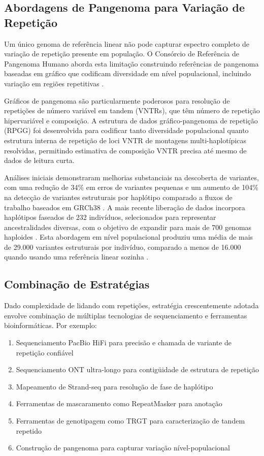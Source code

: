 \subsection{Abordagens de Pangenoma para Variação de Repetição}

Um único genoma de referência linear não pode capturar espectro completo de variação de repetição presente em população. O Consórcio de Referência de Pangenoma Humano \parencite{wang2022} aborda esta limitação construindo referências de pangenoma baseadas em gráfico que codificam diversidade em nível populacional, incluindo variação em regiões repetitivas \parencite{liao2023}.

Gráficos de pangenoma são particularmente poderosos para resolução de repetições de número variável em tandem (VNTRs), que têm número de repetição hipervariável e composição. A estrutura de dados gráfico-pangenoma de repetição (RPGG) foi desenvolvida para codificar tanto diversidade populacional quanto estrutura interna de repetição de loci VNTR de montagens multi-haplotípicas resolvidas, permitindo estimativa de composição VNTR precisa até mesmo de dados de leitura curta.

Análises iniciais demonstraram melhorias substanciais na descoberta de variantes, com uma redução de 34\% em erros de variantes pequenas e um aumento de 104\% na detecção de variantes estruturais por haplótipo comparado a fluxos de trabalho baseados em GRCh38 \parencite{liao2023}. A mais recente liberação de dados incorpora haplótipos faseados de 232 indivíduos, selecionados para representar ancestralidades diversas, com o objetivo de expandir para mais de 700 genomas haploides \parencite{wang2022}. Esta abordagem em nível populacional produziu uma média de mais de 29.000 variantes estruturais por indivíduo, comparado a menos de 16.000 quando usando uma referência linear sozinha \parencite{groza2024}.

\subsection{Combinação de Estratégias}

Dado complexidade de lidando com repetições, estratégia crescentemente adotada envolve combinação de múltiplas tecnologias de sequenciamento e ferramentas bioinformáticas. Por exemplo:

\begin{enumerate}
\item Sequenciamento PacBio HiFi para precisão e chamada de variante de repetição confiável
\item Sequenciamento ONT ultra-longo para contigüidade de estrutura de repetição
\item Mapeamento de Strand-seq para resolução de fase de haplótipo
\item Ferramentas de mascaramento como RepeatMasker para anotação
\item Ferramentas de genotipagem como TRGT para caracterização de tandem repetido
\item Construção de pangenoma para capturar variação nível-populacional
\end{enumerate}

